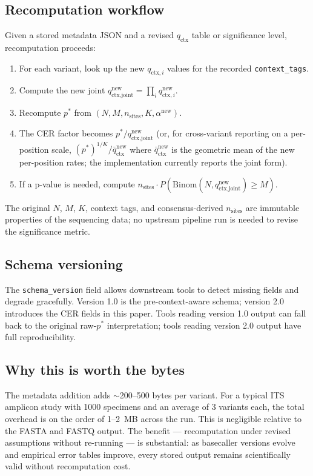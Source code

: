 \documentclass[11pt]{article}
\begin{document}
\subsection{Recomputation workflow}

Given a stored metadata JSON and a revised $q_\text{ctx}$ table or significance
level, recomputation proceeds:

\begin{enumerate}
\item For each variant, look up the new $q_{\text{ctx},i}$ values for the
recorded \texttt{context\_tags}.
\item Compute the new joint $q_\text{ctx,joint}^\text{new} = \prod_i q_{\text{ctx},i}^\text{new}$.
\item Recompute $p^*$ from $(N, M, n_\text{sites}, K, \alpha^\text{new})$.
\item The CER factor becomes $p^* / q_\text{ctx,joint}^\text{new}$ (or, for
cross-variant reporting on a per-position scale, $(p^*)^{1/K} / \bar{q}_\text{ctx}^\text{new}$
where $\bar{q}_\text{ctx}^\text{new}$ is the geometric mean of the new
per-position rates; the implementation currently reports the joint form).
\item If a p-value is needed, compute
$n_\text{sites} \cdot P(\mathrm{Binom}(N, q_\text{ctx,joint}^\text{new}) \geq M)$.
\end{enumerate}

The original $N$, $M$, $K$, context tags, and consensus-derived
$n_\text{sites}$ are immutable properties of the sequencing data; no upstream
pipeline run is needed to revise the significance metric.

\subsection{Schema versioning}

The \texttt{schema\_version} field allows downstream tools to detect missing
fields and degrade gracefully. Version 1.0 is the pre-context-aware schema;
version 2.0 introduces the CER fields in this paper. Tools reading version 1.0
output can fall back to the original raw-$p^*$ interpretation; tools reading
version 2.0 output have full reproducibility.

\subsection{Why this is worth the bytes}

The metadata addition adds $\sim$200--500 bytes per variant. For a typical
ITS amplicon study with 1000 specimens and an average of 3 variants each, the
total overhead is on the order of 1--2~MB across the run. This is negligible
relative to the FASTA and FASTQ output. The benefit --- recomputation under
revised assumptions without re-running --- is substantial: as basecaller
versions evolve and empirical error tables improve, every stored output
remains scientifically valid without recomputation cost.
\end{document}
